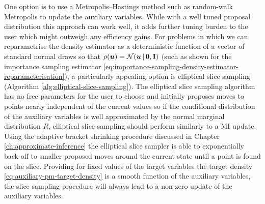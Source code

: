 One option is to use a Metropolis--Hastings method such as random-walk Metropolis to update the auxiliary variables. While with a well tuned proposal distribution this approach can work well, it adds further tuning burden to the user which might outweigh any efficiency gains. For problems in which we can reparametrise the density estimator as a deterministic function of a vector of standard normal draws so that $\rho(\vct{u}) = \nrm{\vct{u} \gvn \vct{0},\mathbf{I}}$ (such as shown for the importance sampling estimator \eqref{eq:importance-sampling-density-estimator-reparameterisation}), a particularly appealing option is elliptical slice sampling (Algorithm \ref{alg:elliptical-slice-sampling}). The elliptical slice sampling algorithm has no free parameters for the user to choose and initially proposes moves to points nearly independent of the current values \citep{murray2010elliptical} so if the conditional distribution of the auxiliary variables is well approximated by the normal marginal distribution $R$, elliptical slice sampling should perform similarly to a \ac{MI} update. Using the adaptive bracket shrinking procedure discussed in Chapter \ref{ch:approximate-inference} the elliptical slice sampler is able to exponentially back-off to smaller proposed moves around the current state until a point is found on the slice. Providing for fixed values of the target variables the target density \eqref{eq:auxiliary-pm-target-density} is a smooth function of the auxiliary variables, the slice sampling procedure will always lead to a non-zero update of the auxiliary variables. %

